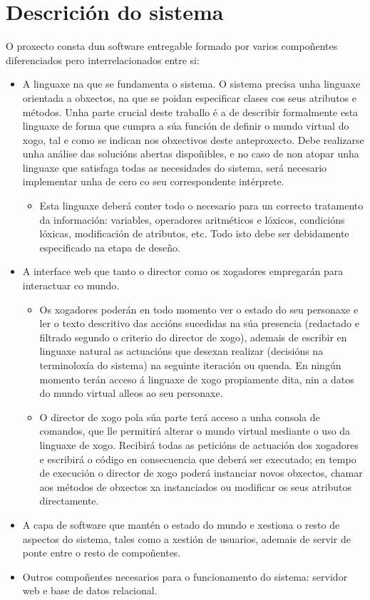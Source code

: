 \section{Descrición do sistema}
O proxecto consta dun software entregable formado por varios compoñentes
diferenciados pero interrelacionados entre si:
\begin{itemize}
  \item A linguaxe na que se fundamenta o sistema. O sistema precisa unha linguaxe
  orientada a obxectos, na que se poidan especificar clases cos seus atributos e métodos. Unha parte crucial
  deste traballo é a de describir formalmente esta linguaxe de forma que cumpra a súa función de
  definir o mundo virtual do xogo, tal e como se indican nos obxectivos deste anteproxecto. Debe
  realizarse unha análise das solucións abertas dispoñibles, e no caso de non atopar unha linguaxe
  que satisfaga todas as necesidades do sistema, será necesario implementar unha de cero co seu
  correspondente intérprete.
  \begin{itemize}
    \item Esta linguaxe deberá conter todo o necesario para un correcto tratamento
    da información:
    variables, operadores aritméticos e lóxicos, condicións lóxicas, modificación de atributos, etc.
    Todo isto debe ser debidamente especificado na etapa de deseño.
  \end{itemize}
  \item A interface web que tanto o director como os xogadores empregarán para
  interactuar co mundo.
  \begin{itemize}
    \item Os xogadores poderán en todo momento ver o estado do seu personaxe e ler o texto descritivo
    das accións sucedidas na súa presencia (redactado e filtrado segundo o criterio do director de
    xogo), ademais de escribir en linguaxe natural as actuacións que desexan realizar (decisións
    na terminoloxía do sistema) na seguinte iteración ou quenda. En ningún momento terán acceso
    á linguaxe de xogo propiamente dita, nin a datos do mundo virtual alleos ao seu personaxe.
    \item O director de xogo pola súa parte terá acceso a unha consola de comandos,
    que lle permitirá alterar o mundo virtual mediante o uso da linguaxe de xogo. Recibirá todas as peticións de
    actuación dos xogadores e escribirá o código en consecuencia que deberá ser executado; en
    tempo de execución o director de xogo poderá instanciar novos obxectos, chamar aos métodos
    de obxectos xa instanciados ou modificar os seus atributos directamente.
  \end{itemize}
  \item A capa de software que mantén o estado do mundo e xestiona o resto de
  aspectos do sistema, tales como a xestión de usuarios, ademais de servir de ponte entre o resto de compoñentes.
  \item Outros compoñentes necesarios para o funcionamento do sistema: servidor
  web e base de datos relacional.
\end{itemize}

